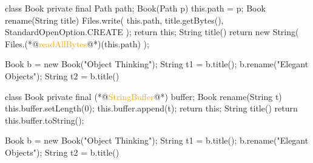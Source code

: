 \documentclass{article}
\begin{document}
\begin{lnSnippet}
class Book {
  private final Path path;
  Book(Path p) { this.path = p; }
  Book rename(String title) {
    Files.write(
      this.path,
      title.getBytes(),
      StandardOpenOption.CREATE
    );
    return this;
  }
  String title() {
    return new String(
      Files.(*@\textcolor{orange}{readAllBytes}@*)(this.path)
    );
  }
}
\end{lnSnippet}
\begin{lnSnippet}
Book b = new Book("Object Thinking");
String t1 = b.title();
b.rename("Elegant Objects");
String t2 = b.title()
\end{lnSnippet}

\begin{lnSnippet}
class Book {
  private final (*@\textcolor{orange}{StringBuffer}@*) buffer;
  Book rename(String t) {
    this.buffer.setLength(0);
    this.buffer.append(t);
    return this;
  }
  String title() {
    return this.buffer.toString();
  }
}
\end{lnSnippet}
\begin{lnSnippet}
Book b = new Book("Object Thinking");
String t1 = b.title();
b.rename("Elegant Objects");
String t2 = b.title()
\end{lnSnippet}
\end{document}
